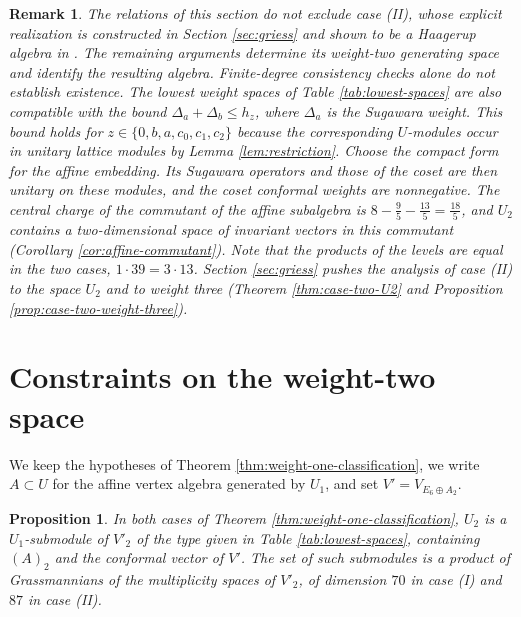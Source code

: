 \documentclass[leqno]{article}
\renewcommand{\leq}{\ensuremath{\leqslant}}
\newtheorem{prop}[thm]{Proposition}
\newtheorem{remark}[thm]{Remark}
\numberwithin{equation}{section}
\begin{document}
\begin{remark}\normalfont
\label{rem:case-two}
The relations of this section do not exclude case (II), whose explicit realization is constructed in Section \ref{sec:griess} and shown to be a Haagerup algebra in \cite[Theorem 6.1]{ArhIII}. The remaining arguments determine its weight-two generating space and identify the resulting algebra. Finite-degree consistency checks alone do not establish existence. The lowest weight spaces of Table \ref{tab:lowest-spaces} are also compatible with the bound $\Delta_a+\Delta_b \leq h_z$, where $\Delta_a$ is the Sugawara weight. This bound holds for $z \in \{0,b,a,\allowbreak c_0,c_1,c_2\}$ because the corresponding $U$-modules occur in unitary lattice modules by Lemma \ref{lem:restriction}. Choose the compact form for the affine embedding. Its Sugawara operators and those of the coset are then unitary on these modules, and the coset conformal weights are nonnegative. The central charge of the commutant of the affine subalgebra is $8-\frac95-\frac{13}{5} = \frac{18}{5}$, and $U_2$ contains a two-dimensional space of invariant vectors in this commutant (Corollary \ref{cor:affine-commutant}). Note that the products of the levels are equal in the two cases, $1 \cdot 39 = 3 \cdot 13$. Section \ref{sec:griess} pushes the analysis of case (II) to the space $U_2$ and to weight three (Theorem \ref{thm:case-two-U2} and Proposition \ref{prop:case-two-weight-three}).
\end{remark}

\section{Constraints on the weight-two space}
\label{sec:uniqueness}

We keep the hypotheses of Theorem \ref{thm:weight-one-classification}, we write $A \subset U$ for the affine vertex algebra generated by $U_1$, and set $V' = V_{E_6 \oplus A_2}$.

\begin{prop}
\label{prop:u2-moduli}
In both cases of Theorem \ref{thm:weight-one-classification}, $U_2$ is a $U_1$-submodule of $V'_2$ of the type given in Table \ref{tab:lowest-spaces}, containing $(A)_2$ and the conformal vector of $V'$. The set of such submodules is a product of Grassmannians of the multiplicity spaces of $V'_2$, of dimension $70$ in case (I) and $87$ in case (II).
\end{prop}
\end{document}
